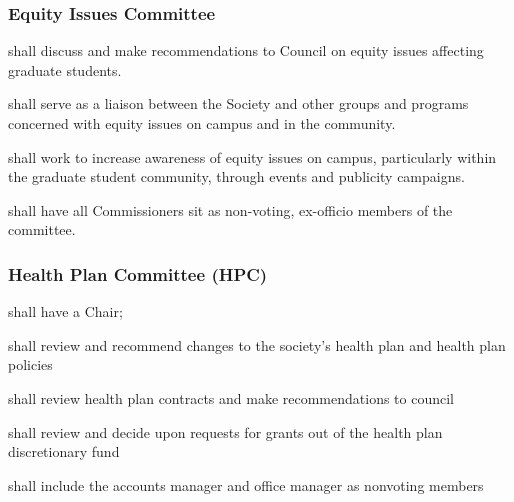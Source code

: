 \subsubsection{Equity Issues Committee} 
\begin{longenum}[ label*=\thesubsubsection.\arabic*., align=left]
	\item shall discuss and make recommendations to Council on equity issues affecting graduate students.
    \item shall serve as a liaison between the Society and other groups and programs concerned with equity issues on campus and in the community.
    \item shall work to increase awareness of equity issues on campus, particularly within the graduate student community, through events and publicity campaigns.
    \item shall have all Commissioners sit as non-voting, ex-officio members of the committee.
    
\end{longenum}

\subsubsection{Health Plan Committee (HPC)} 
\begin{longenum}[ label*=\thesubsubsection.\arabic*., align=left]
	\item shall have a Chair;
    \item shall review and recommend changes to the society's health plan and health plan policies 
    \item shall review health plan contracts and make recommendations to council 
    \item shall review and decide upon requests for grants out of the health plan discretionary fund
    \item shall include the accounts manager and office manager as nonvoting members
\end{longenum}

